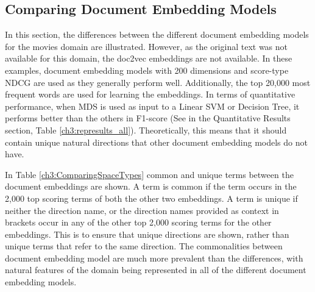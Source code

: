 \subsection{Comparing Document Embedding Models}\label{ch3:differentembeddingmodels}

In this section, the differences between the different document embedding models for the movies domain are illustrated.  However, as the original text was not available for this domain, the  doc2vec embeddings are not available. In these examples, document embedding models with  200 dimensions and score-type NDCG are used as they generally perform well. Additionally, the top 20,000 most frequent words are used  for learning the embeddings. In terms of quantitative performance,  when MDS is used as input to a Linear SVM or Decision Tree, it performs better than the others in F1-score (See in the Quantitative Results section, Table \ref{ch3:represults_all}). Theoretically, this means that it should contain unique natural directions that other document embedding models do not have. 

In Table \ref{ch3:ComparingSpaceTypes} common and unique terms between the document embeddings are shown. A term  is  common if the term occurs in the 2,000 top scoring terms of both the other two embeddings. A term is unique  if neither the direction name, or the direction names provided as context in brackets occur in any of the other top 2,000 scoring terms for the other embeddings. This is to ensure that unique directions are shown, rather than unique terms that refer to the same direction. The commonalities between document embedding model are much more prevalent than the differences, with natural features of the domain being represented in all of the different document embedding models. 

